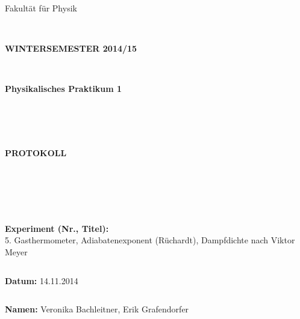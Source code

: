 \documentclass{article}
\begin{document}
\thispagestyle{empty}
			\begin{center}
			\Large{Fakultät für Physik}\\
			\end{center}
\begin{verbatim}


\end{verbatim}
			\begin{center}
			\textbf{\LARGE WINTERSEMESTER 2014/15}
			\end{center}
\begin{verbatim}


\end{verbatim}
			\begin{center}
			\textbf{\LARGE{Physikalisches Praktikum 1}}
			\end{center}
\begin{verbatim}




\end{verbatim}

			\begin{center}
			\textbf{\LARGE{PROTOKOLL}}
			\end{center}
			
\begin{verbatim}





\end{verbatim}

			\begin{flushleft}
			\textbf{\Large{Experiment (Nr., Titel):}}\\
			\LARGE{5. Gasthermometer, Adiabatenexponent (Rüchardt), Dampfdichte nach Viktor Meyer}	
			\end{flushleft}

\begin{verbatim}

\end{verbatim}	
			\begin{flushleft}
			\textbf{\Large{Datum:}}\Large{ 14.11.2014}
			\end{flushleft}
			
\begin{verbatim}
\end{verbatim}
		\begin{flushleft}
			\textbf{\Large{Namen:}} \Large{Veronika Bachleitner, Erik Grafendorfer}
			\end{flushleft}
\end{document}
